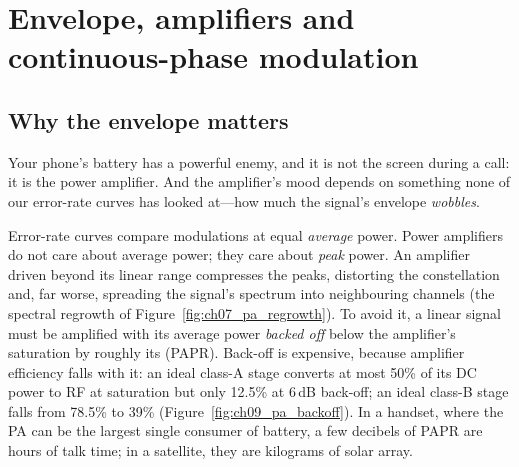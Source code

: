 
\section{Envelope, amplifiers and continuous-phase modulation}
\label{sec:ch09:constenv}

\subsection{Why the envelope matters}

Your phone's battery has a powerful enemy, and it is not the screen during a call: it is the
power amplifier. And the amplifier's mood depends on something none of our error-rate curves has
looked at---how much the signal's envelope \emph{wobbles}.

Error-rate curves compare modulations at equal \emph{average} power. Power amplifiers do not care
about average power; they care about \emph{peak} power. An amplifier driven beyond its linear
range compresses the peaks, distorting the constellation and, far worse, spreading the signal's
spectrum into neighbouring channels (the spectral regrowth of Figure~\ref{fig:ch07_pa_regrowth}).
To avoid it, a linear signal must be amplified with its average power \emph{backed off} below the
amplifier's saturation by roughly its  (PAPR). Back-off is
expensive, because amplifier efficiency falls with it: an ideal class-A stage converts at most
50\% of its DC power to RF at saturation but only 12.5\% at 6\,dB back-off; an ideal class-B stage
falls from 78.5\% to 39\% (Figure~\ref{fig:ch09_pa_backoff}). In a handset, where the PA can be
the largest single consumer of battery, a few decibels of PAPR are hours of talk time; in a
satellite, they are kilograms of solar array.


